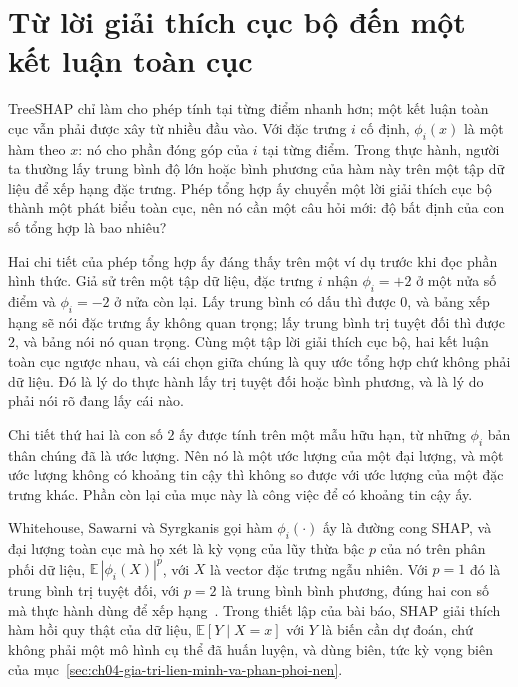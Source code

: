 \section{Từ lời giải thích cục bộ đến một kết luận toàn cục}
\label{sec:ch04-tu-cuc-bo-den-toan-cuc}

%
TreeSHAP chỉ làm cho phép tính tại từng điểm nhanh hơn; một kết luận toàn cục
vẫn phải được xây từ nhiều đầu vào. Với đặc trưng $i$ cố định, $\phi_i(x)$ là một hàm
theo $x$: nó cho phần đóng góp của $i$ tại từng điểm. Trong thực hành, người
ta thường lấy trung bình độ lớn hoặc bình phương của hàm này trên một
tập dữ liệu để xếp hạng đặc trưng. Phép tổng hợp ấy chuyển một lời giải thích
cục bộ thành một phát biểu toàn cục, nên nó cần một câu hỏi mới: độ bất định
của con số tổng hợp là bao nhiêu?

Hai chi tiết của phép tổng hợp ấy đáng thấy trên một ví dụ trước khi đọc phần
hình thức. Giả sử trên một tập dữ liệu, đặc trưng $i$ nhận $\phi_i = +2$ ở một
nửa số điểm và $\phi_i = -2$ ở nửa còn lại. Lấy trung bình có dấu thì được $0$,
và bảng xếp hạng sẽ nói đặc trưng ấy không quan trọng; lấy trung bình trị tuyệt
đối thì được $2$, và bảng nói nó quan trọng. Cùng một tập lời giải thích cục bộ,
hai kết luận toàn cục ngược nhau, và cái chọn giữa chúng là quy ước tổng hợp chứ
không phải dữ liệu. Đó là lý do thực hành lấy trị tuyệt đối hoặc bình phương, và
là lý do phải nói rõ đang lấy cái nào.

Chi tiết thứ hai là con số $2$ ấy được tính trên một mẫu hữu hạn, từ những
$\phi_i$ bản thân chúng đã là ước lượng. Nên nó là một ước lượng của một đại
lượng, và một ước lượng không có khoảng tin cậy thì không so được với ước lượng
của một đặc trưng khác. Phần còn lại của mục này là công việc để có khoảng tin
cậy ấy.

Whitehouse, Sawarni và Syrgkanis gọi hàm $\phi_i(\cdot)$ ấy là đường cong
SHAP, và đại lượng toàn cục mà họ xét là kỳ vọng của lũy thừa bậc $p$ của nó
trên phân phối dữ liệu, $\mathbb{E}\,|\phi_i(X)|^p$, với $X$ là vector đặc
trưng ngẫu nhiên. Với $p=1$ đó là trung bình trị tuyệt đối, với $p=2$ là trung
bình bình phương, đúng hai con số mà thực hành dùng để xếp
hạng~\autocite{p19shapinference}. Trong thiết lập của bài báo, SHAP giải thích
hàm hồi quy thật của dữ liệu, $\mathbb{E}[Y\mid X=x]$ với $Y$ là biến cần dự
đoán, chứ không phải một mô hình cụ thể đã huấn luyện, và dùng
 biên, tức kỳ vọng biên của
mục~\ref{sec:ch04-gia-tri-lien-minh-va-phan-phoi-nen}.

